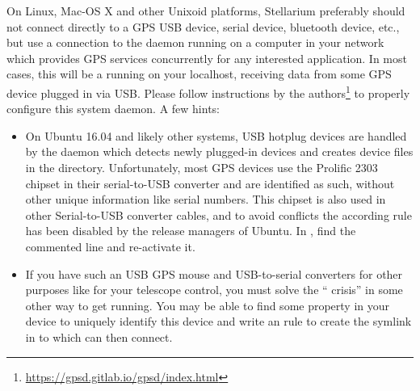 On Linux, Mac-OS X and other Unixoid platforms, Stellarium preferably
should not connect directly to a GPS USB device, serial device,
bluetooth device, etc., but use a connection to the 
daemon running on a computer in your network which provides GPS
services concurrently for any interested application. In most cases,
this will be a  running on your localhost, receiving
data from some GPS device plugged in via USB.
Please follow instructions by the 
authors\footnote{\url{https://gpsd.gitlab.io/gpsd/index.html}} to properly
configure this system daemon.  A few hints:
\begin{itemize}
\item On Ubuntu 16.04 and likely other systems, USB hotplug devices
  are handled by the  daemon which detects newly
  plugged-in devices and creates device files in the 
  directory. Unfortunately, most GPS devices use the Prolific 2303
  chipset in their serial-to-USB converter and are identified as
  such, without other unique information like serial numbers. 
  This chipset is also used in other Serial-to-USB converter
  cables, and to avoid conflicts the according rule has been disabled
  by the release managers of Ubuntu.  In
  , find the commented line and
  re-activate it.

\item If you have such an USB GPS mouse and USB-to-serial converters
  for other purposes like for your telescope control, you must solve
  the `` crisis'' in some other way to get
   running. You may be able to find some property in
  your device to uniquely identify this device and write an
   rule to create the symlink in  to
  which  can then connect.


\end{itemize}
